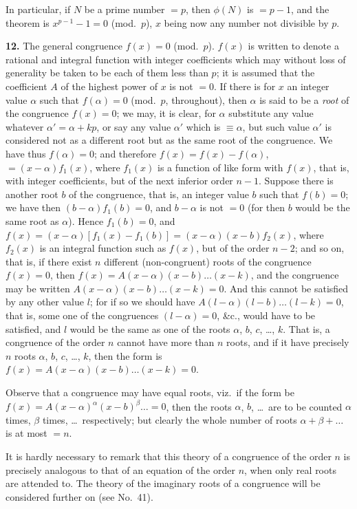 \documentclass[11pt,a4paper]{book}
\begin{document}
In particular, if $N$ be a prime number $=p$, then $\phi(N)$ is $=p-1$, and the theorem is $x^{p-1}-1=0$ (mod.\ $p$), $x$ being now any number not divisible by $p$.

\textbf{12.} The general congruence $f(x)=0$ (mod.\ $p$). $f(x)$ is written to denote a rational and integral function with integer coefficients which may without loss of generality be taken to be each of them less than $p$; it is assumed that the coefficient $A$ of the highest power of $x$ is not $=0$. If there is for $x$ an integer value $\alpha$ such that $f(\alpha)=0$ (mod.\ $p$, throughout), then $\alpha$ is said to be a \textit{root} of the congruence $f(x)=0$; we may, it is clear, for $\alpha$ substitute any value whatever $\alpha'=\alpha+kp$, or say any value $\alpha'$ which is $\equiv\alpha$, but such value $\alpha'$ is considered not as a different root but as the same root of the congruence. We have thus $f(\alpha)=0$; and therefore $f(x)=f(x)-f(\alpha)$, $=(x-\alpha)f_1(x)$, where $f_1(x)$ is a function of like form with $f(x)$, that is, with integer coefficients, but of the next inferior order $n-1$. Suppose there is another root $b$ of the congruence, that is, an integer value $b$ such that $f(b)=0$; we have then $(b-\alpha)f_1(b)=0$, and $b-\alpha$ is not $=0$ (for then $b$ would be the same root as $\alpha$). Hence $f_1(b)=0$, and $f(x)=(x-\alpha)[f_1(x)-f_1(b)]=(x-\alpha)(x-b)f_2(x)$, where $f_2(x)$ is an integral function such as $f(x)$, but of the order $n-2$; and so on, that is, if there exist $n$ different (non-congruent) roots of the congruence $f(x)=0$, then $f(x)=A(x-\alpha)(x-b)\ldots(x-k)$, and the congruence may be written $A(x-\alpha)(x-b)\ldots(x-k)=0$. And this cannot be satisfied by any other value $l$; for if so we should have $A(l-\alpha)(l-b)\ldots(l-k)=0$, that is, some one of the congruences $(l-\alpha)=0$, \&c., would have to be satisfied, and $l$ would be the same as one of the roots $\alpha$, $b$, $c$, \ldots, $k$. That is, a congruence of the order $n$ cannot have more than $n$ roots, and if it have precisely $n$ roots $\alpha$, $b$, $c$, \ldots, $k$, then the form is $f(x)=A(x-\alpha)(x-b)\ldots(x-k)=0$.

Observe that a congruence may have equal roots, viz.\ if the form be $f(x)=A(x-\alpha)^\alpha(x-b)^\beta\ldots=0$, then the roots $\alpha$, $b$, \ldots\ are to be counted $\alpha$ times, $\beta$ times, \ldots\ respectively; but clearly the whole number of roots $\alpha+\beta+\ldots$ is at most $=n$.

It is hardly necessary to remark that this theory of a congruence of the order $n$ is precisely analogous to that of an equation of the order $n$, when only real roots are attended to. The theory of the imaginary roots of a congruence will be considered further on (see No.~41).
\end{document}
